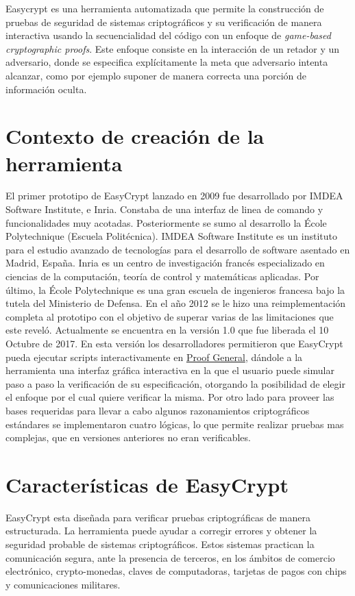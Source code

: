 \documentclass[runningheads]{llncs}
\begin{document}
Easycrypt es una herramienta automatizada que permite la construcción de pruebas de seguridad de sistemas criptográficos y su verificación de manera interactiva usando la secuencialidad del código con un enfoque de \textit{game-based cryptographic proofs}. Este enfoque consiste en la interacción de un retador y un adversario, donde se especifica explícitamente la meta que adversario intenta alcanzar, como por ejemplo suponer de manera correcta una porción de información oculta.

\section{Contexto de creación de la herramienta}
El primer prototipo de EasyCrypt lanzado en 2009 fue desarrollado por IMDEA Software Institute, e Inria. Constaba de una interfaz de linea 	de comando y funcionalidades muy acotadas. Posteriormente se sumo al desarrollo la École Polytechnique (Escuela Politécnica). IMDEA Software Institute es un instituto para el estudio avanzado de tecnologías para el desarrollo de software asentado en Madrid, España. Inria es un centro de investigación francés especializado en ciencias de la computación, teoría de control y matemáticas aplicadas. Por último, la École Polytechnique es una gran escuela de ingenieros francesa bajo la tutela del Ministerio de Defensa. En el año 2012 se le hizo una reimplementación completa al prototipo con el objetivo de superar varias de las limitaciones que este reveló. Actualmente se encuentra en la versión 1.0 que fue liberada el 10 Octubre de 2017. En esta versión los desarrolladores permitieron que EasyCrypt pueda ejecutar scripts interactivamente en \href{https://proofgeneral.github.io}{Proof General}, dándole a la herramienta una interfaz gráfica interactiva en la que el usuario puede simular paso a paso la verificación de su especificación, otorgando la posibilidad de elegir el enfoque por el cual quiere verificar la misma. Por otro lado para proveer las bases requeridas para llevar a cabo algunos razonamientos criptográficos estándares se implementaron cuatro lógicas, lo que permite realizar pruebas mas complejas, que en versiones anteriores no eran verificables.

\section{Características de EasyCrypt}

EasyCrypt esta diseñada para verificar pruebas criptográficas de manera estructurada. La herramienta puede ayudar a corregir errores y obtener la seguridad probable de sistemas criptográficos. Estos sistemas practican la comunicación segura, ante la presencia de terceros, en los ámbitos de comercio electrónico, crypto-monedas, claves de computadoras, tarjetas de pagos con chips y comunicaciones militares.
\end{document}
